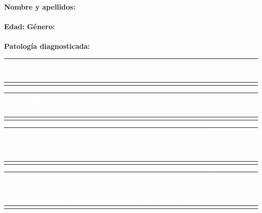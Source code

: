 \documentclass[11pt,a4paper]{article}
\begin{document}
\noindent
\textbf{Nombre y apellidos:} \hrulefill \\[-0.5em] \\
\textbf{Edad:} \makebox[3cm]{\hrulefill} \hspace{1cm} 
\textbf{Género:}  \hspace{0.5cm}  \hspace{0.5cm}  \\[-0.5em] \\
\textbf{Patología diagnosticada:} \hrulefill 
\vspace{0.8cm}

\noindent
\begin{tabularx}{\linewidth}{|X|}
\hline
\rowcolor{ArthroTeal}
\textcolor{white}{\textbf{1. ¿Qué movimiento concreto o paso del proceso le resulta más difícil y doloroso al utilizar el inhalador durante su rutina diaria?}} \\ \hline
\rule{0pt}{1.4cm} \\ %
\hline
\end{tabularx}

\vspace{0.5cm}

\noindent
\begin{tabularx}{\linewidth}{|X|}
\hline
\rowcolor{ArthroTeal}
\textcolor{white}{\textbf{2. Cuando siente rigidez o dolor articular, ¿qué estrategias, trucos caseros o ayuda externa utiliza para lograr administrarse la dosis?}} \\ \hline
\rule{0pt}{1.4cm} \\ 
\hline
\end{tabularx}

\vspace{0.5cm}

\noindent
\begin{tabularx}{\linewidth}{|X|}
\hline
\rowcolor{ArthroTeal}
\textcolor{white}{\textbf{3. ¿Cómo le hace sentir el hecho de no poder accionarlo correctamente o dudar de si ha recibido la dosis adecuada por falta de fuerza?}} \\ \hline
\rule{0pt}{1.4cm} \\ 
\hline
\end{tabularx}

\vspace{0.5cm}

\noindent
\begin{tabularx}{\linewidth}{|X|}
\hline
\rowcolor{ArthroTeal}
\textcolor{white}{\textbf{4. Si existiera un accesorio acoplado para facilitar la presión, ¿preferiría priorizar un tamaño muy pequeño para llevarlo consigo o un agarre grande y cómodo aunque ocupe más espacio?}} \\ \hline
\rule{0pt}{1.4cm} \\ 
\hline
\end{tabularx}
\end{document}

